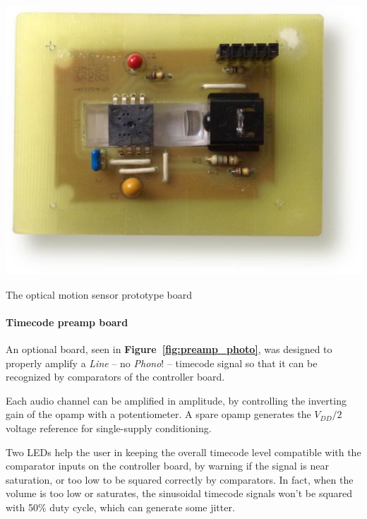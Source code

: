 \documentclass[a4paper,10pt]{article}
\makeatletter
\newenvironment{figurehere}{\def\@captype{figure}\vspace{2ex}}{\vspace{2ex}}
\newcommand{\citef}[1]{\textbf{Figure~\ref{#1}}}
\makeatother
\begin{document}
\begin{multicols}{2}
\begin{figurehere}
	\centering
	\includegraphics[keepaspectratio=true,width=\columnwidth]{images/sensor_photo.pdf}
	\caption{The optical motion sensor prototype board}
	\label{fig:sensor_photo}
\end{figurehere}


\paragraph{Timecode preamp board}
An optional board, seen in \citef{fig:preamp_photo}, was designed to properly
amplify a \emph{Line} -- no \emph{Phono}! -- timecode signal so that it can be
recognized by comparators of the controller board.

Each audio channel can be amplified in amplitude, by controlling the inverting
gain of the opamp with a potentiometer. A spare opamp generates the $V_{DD}/2$
voltage reference for single-supply conditioning.

Two LEDs help the user in keeping the overall timecode level compatible with
the comparator inputs on the controller board, by warning if the signal is
near saturation, or too low to be squared correctly by comparators.
In fact, when the volume is too low or saturates, the sinusoidal timecode
signals won't be squared with 50\% duty cycle, which can generate some jitter.


\end{multicols}
\end{document}
